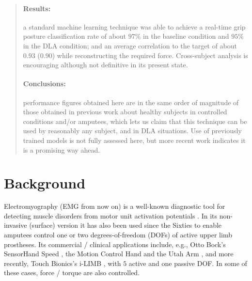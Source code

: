 \documentclass[10pt]{bmc_article}
\newenvironment{bmcformat}
  {\begin{raggedright}\baselineskip20pt\sloppy\setboolean{publ}{false}}
  {\end{raggedright}\baselineskip20pt\sloppy}
\begin{document}
\begin{bmcformat}
\begin{abstract}
\paragraph*{Results:}

a standard machine learning technique was able to achieve a real-time grip
posture classification rate of about $97\%$ in the baseline condition and
$95\%$ in the DLA condition; and an average correlation to the target of
about $0.93$ ($0.90$) while reconstructing the required force. Cross-subject analysis
is encouraging although not definitive in its present state.

\paragraph*{Conclusions:}

performance figures obtained here are in the same order of magnitude of
those obtained in previous work about healthy subjects in controlled conditions
and/or amputees, which lets us claim that this technique can be used
by reasonably any subject, and in DLA situations. Use of previously trained
models is not fully assessed here, but more recent work indicates it is a
promising way ahead.

\end{abstract}


\section*{Background}
\label{sec:introduction}

Electromyography (EMG from now on) is a well-known diagnostic tool
for detecting muscle disorders from motor unit activation potentials
\cite{deluca97,deluca02}. In its non-invasive (surface) version it
has also been used since the Sixties \cite{bottomley65,childress69,sears}
to enable amputees control one or two degrees-of-freedom (DOFs)
of active upper limb prostheses. Its commercial / clinical applications
include, e.g., Otto Bock's SensorHand Speed \cite{sensorhand}, the Motion
Control Hand and the Utah Arm \cite{mchand}, and more recently,
Touch Bionics's i-LIMB \cite{ilimb}, with $5$ active and one passive DOF.
In some of these cases, force / torque are also controlled.


\end{bmcformat}
\end{document}
